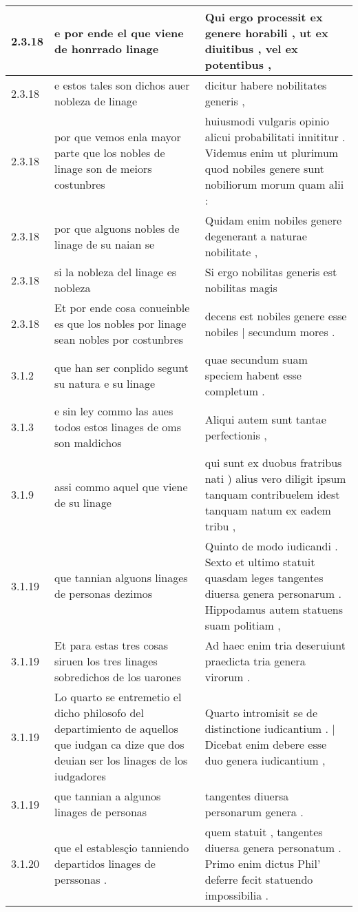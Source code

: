 \begin{tabular}{|p{1cm}|p{6.5cm}|p{6.5cm}|}
2.3.18 & e por ende el que viene de honrrado linage & Qui ergo processit ex genere horabili , ut ex diuitibus , vel ex potentibus , \\\hline
2.3.18 & e estos tales son dichos auer nobleza de linage & dicitur habere nobilitates generis , \\\hline
2.3.18 & por que vemos enla mayor parte que los nobles de linage son de meiors costunbres & huiusmodi vulgaris opinio alicui probabilitati innititur . Videmus enim ut plurimum quod nobiles genere sunt nobiliorum morum quam alii : \\\hline
2.3.18 & por que alguons nobles de linage de su naian se & Quidam enim nobiles genere degenerant a naturae nobilitate , \\\hline
2.3.18 & si la nobleza del linage es nobleza & Si ergo nobilitas generis est nobilitas magis \\\hline
2.3.18 & Et por ende cosa conueinble es que los nobles por linage sean nobles por costunbres & decens est nobiles genere esse nobiles | secundum mores . \\\hline
3.1.2 & que han ser conplido segunt su natura e su linage & quae secundum suam speciem habent esse completum . \\\hline
3.1.3 & e sin ley commo las aues todos estos linages de oms son maldichos & Aliqui autem sunt tantae perfectionis , \\\hline
3.1.9 & assi commo aquel que viene de su linage & qui sunt ex duobus fratribus nati ) alius vero diligit ipsum tanquam contribuelem idest tanquam natum ex eadem tribu , \\\hline
3.1.19 & que tannian alguons linages de personas dezimos & Quinto de modo iudicandi . Sexto et ultimo statuit quasdam leges tangentes diuersa genera personarum . Hippodamus autem statuens suam politiam , \\\hline
3.1.19 & Et para estas tres cosas siruen los tres linages sobredichos de los uarones & Ad haec enim tria deseruiunt praedicta tria genera virorum . \\\hline
3.1.19 & Lo quarto se entremetio el dicho philosofo del departimiento de aquellos que iudgan ca dize que dos deuian ser los linages de los iudgadores & Quarto intromisit se de distinctione iudicantium . | Dicebat enim debere esse duo genera iudicantium , \\\hline
3.1.19 & que tannian a algunos linages de personas & tangentes diuersa personarum genera . \\\hline
3.1.20 & que el establesçio tanniendo departidos linages de perssonas . & quem statuit , tangentes diuersa genera personatum . Primo enim dictus Phil’ deferre fecit statuendo impossibilia . \\\hline

\end{tabular}
